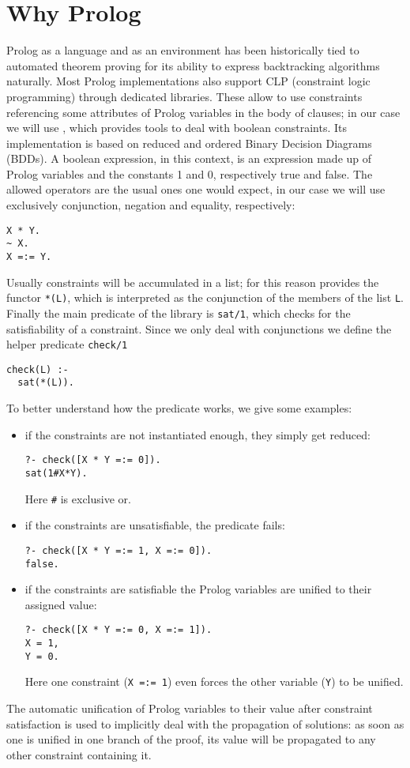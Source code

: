 \section{Why Prolog}%
Prolog as a language and as an environment has been historically tied to automated theorem proving for its ability to express backtracking algorithms naturally.
Most Prolog implementations also support CLP (constraint logic programming) through dedicated libraries.
These allow to use constraints referencing some attributes of Prolog variables in the body of clauses; in our case we will use \CLPB{} \cite{clpb}, which provides tools to deal with boolean constraints.
Its implementation is based on reduced and ordered Binary Decision Diagrams (BDDs).
A boolean expression, in this context, is an expression made up of Prolog variables and the constants 1 and 0, respectively true and false.
The allowed operators are the usual ones one would expect, in our case we will use exclusively conjunction, negation and equality, respectively:
\begin{verbatim}
X * Y.
~ X.
X =:= Y.
\end{verbatim}
Usually constraints will be accumulated in a list; for this reason \CLPB{} provides the functor \texttt{*(L)}, which is interpreted as the conjunction of the members of the list \texttt{L}.
Finally the main predicate of the library is \texttt{sat/1}, which checks for the satisfiability of a constraint.
Since we only deal with conjunctions we define the helper predicate \texttt{check/1}
\begin{verbatim}
check(L) :-
  sat(*(L)).
\end{verbatim}
To better understand how the predicate works, we give some examples:
\begin{itemize}
	\item if the constraints are not instantiated enough, they simply get reduced:
\begin{verbatim}
?- check([X * Y =:= 0]).
sat(1#X*Y).
\end{verbatim}
	Here \texttt{\#} is exclusive or.
	\item if the constraints are unsatisfiable, the predicate fails:
\begin{verbatim}
?- check([X * Y =:= 1, X =:= 0]).
false.
\end{verbatim}
	\item if the constraints are satisfiable the Prolog variables are unified to their assigned value:
\begin{verbatim}
?- check([X * Y =:= 0, X =:= 1]).
X = 1,
Y = 0.
\end{verbatim}
	Here one constraint (\texttt{X =:= 1}) even forces the other variable (\texttt{Y}) to be unified.
\end{itemize}
The automatic unification of Prolog variables to their value after constraint satisfaction is used to implicitly deal with the propagation of solutions: as soon as one is unified in one branch of the proof, its value will be propagated to any other constraint containing it.

